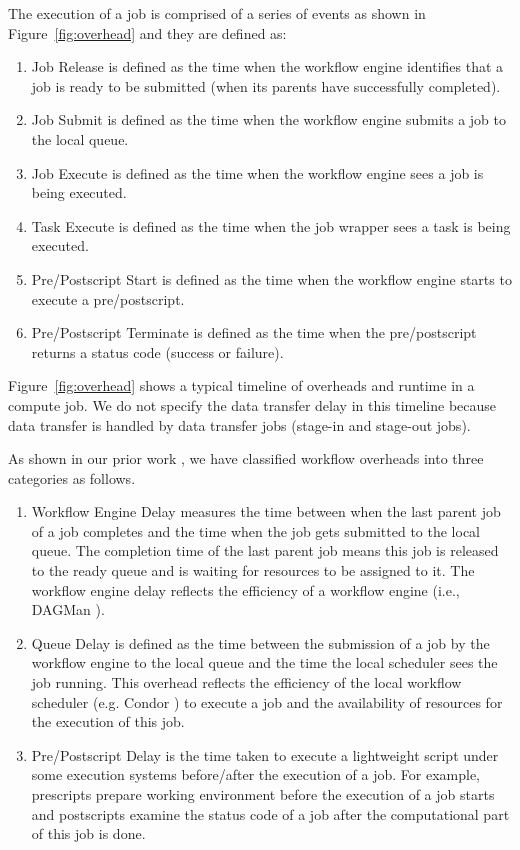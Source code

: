 \documentclass[final]{IEEEtran}
\begin{document}
The execution of a job is comprised of a series of events as shown in Figure~\ref{fig:overhead} and they are defined as:
\begin{enumerate}
\item Job Release is defined as the time when the workflow engine identifies that a job is ready to be submitted (when its parents have successfully completed). 
\item Job Submit is defined as the time when the workflow engine submits a job to the local queue. 
\item Job Execute is defined as the time when the workflow engine sees a job is being executed. 
\item Task Execute is defined as the time when the job wrapper sees a task is being executed. 
\item Pre/Postscript Start is defined as the time when the workflow engine starts to execute a pre/postscript. 
\item Pre/Postscript Terminate is defined as the time when the pre/postscript returns a status code (success or failure). 
\end{enumerate}

Figure~\ref{fig:overhead} shows a typical timeline of overheads and runtime in a compute job. We do not specify the data transfer delay in this timeline because data transfer is handled by data transfer jobs (stage-in and stage-out jobs). 

As shown in our prior work \cite{Chen}, we have classified workflow overheads into three categories as follows. 
\begin{enumerate}

\item{Workflow Engine Delay} measures the time between when the last parent job of a job completes and the time when the job gets submitted to the local queue. The completion time of the last parent job means this job is released to the ready queue and is waiting for resources to be assigned to it. The workflow engine delay reflects the efficiency of a workflow engine (i.e., DAGMan \cite{DAGMan}). 

\item{Queue Delay} is defined as the time between the submission of a job by the workflow engine to the local queue and the time the local scheduler sees the job running. This overhead reflects the efficiency of the local workflow scheduler (e.g. Condor \cite{Frey2002}) to execute a job and the availability of resources for the execution of this job. 

\item{Pre/Postscript Delay } is the time taken to execute a lightweight script under some execution systems before/after the execution of a job. For example, prescripts prepare working environment before the execution of a job starts and postscripts examine the status code of a job after the computational part of this job is done.


\end{enumerate}
\end{document}
